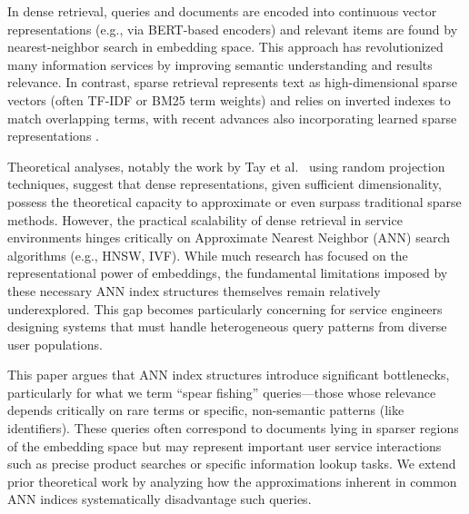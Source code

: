 \documentclass[conference]{IEEEtran}
\begin{document}
In dense retrieval, queries and documents are encoded into continuous vector representations (e.g., via BERT-based encoders) and relevant items are found by nearest-neighbor search in embedding space. This approach has revolutionized many information services by improving semantic understanding and results relevance. In contrast, sparse retrieval represents text as high-dimensional sparse vectors (often TF-IDF or BM25 term weights) and relies on inverted indexes to match overlapping terms, with recent advances also incorporating learned sparse representations \cite{formal2021splade}.

Theoretical analyses, notably the work by Tay et al.\ \cite{tay2020sparse} using random projection techniques, suggest that dense representations, given sufficient dimensionality, possess the theoretical capacity to approximate or even surpass traditional sparse methods. However, the practical scalability of dense retrieval in service environments hinges critically on Approximate Nearest Neighbor (ANN) search algorithms (e.g., HNSW, IVF). While much research has focused on the representational power of embeddings, the fundamental limitations imposed by these necessary ANN index structures themselves remain relatively underexplored. This gap becomes particularly concerning for service engineers designing systems that must handle heterogeneous query patterns from diverse user populations.

This paper argues that ANN index structures introduce significant bottlenecks, particularly for what we term ``spear fishing'' queries—those whose relevance depends critically on rare terms or specific, non-semantic patterns (like identifiers). These queries often correspond to documents lying in sparser regions of the embedding space but may represent important user service interactions such as precise product searches or specific information lookup tasks. We extend prior theoretical work \cite{tay2020sparse, fan2022information} by analyzing how the approximations inherent in common ANN indices systematically disadvantage such queries.
\end{document}

